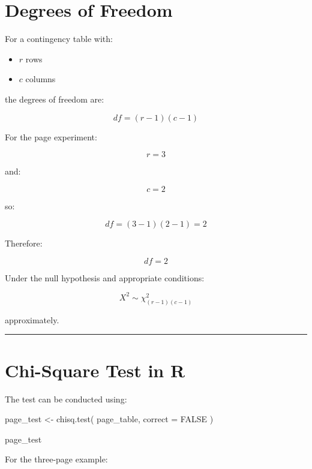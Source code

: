 \documentclass[
  letterpaper,
  DIV=11,
  numbers=noendperiod]{scrreprt}
\newenvironment{Shaded}{\begin{snugshade}}{\end{snugshade}}
\newcommand{\AttributeTok}[1]{\textcolor[rgb]{0.40,0.45,0.13}{#1}}
\newcommand{\ConstantTok}[1]{\textcolor[rgb]{0.56,0.35,0.01}{#1}}
\newcommand{\FunctionTok}[1]{\textcolor[rgb]{0.28,0.35,0.67}{#1}}
\newcommand{\NormalTok}[1]{\textcolor[rgb]{0.00,0.23,0.31}{#1}}
\newcommand{\OtherTok}[1]{\textcolor[rgb]{0.00,0.23,0.31}{#1}}
\providecommand{\tightlist}{%
  \setlength{\itemsep}{0pt}\setlength{\parskip}{0pt}}
\begin{document}

\chapter{Degrees of Freedom}\label{degrees-of-freedom}

For a contingency table with:

\begin{itemize}
\tightlist
\item
  \(r\) rows
\item
  \(c\) columns
\end{itemize}

the degrees of freedom are:

\[
\boxed{
df=(r-1)(c-1)
}
\]

For the page experiment:

\[
r=3
\]

and:

\[
c=2
\]

so:

\[
df
=
(3-1)(2-1)
=
2
\]

Therefore:

\[
\boxed{df=2}
\]

Under the null hypothesis and appropriate conditions:

\[
X^2
\sim
\chi^2_{(r-1)(c-1)}
\]

approximately.

\begin{center}\rule{0.5\linewidth}{0.5pt}\end{center}


\chapter{Chi-Square Test in R}\label{chi-square-test-in-r}

The test can be conducted using:

\begin{Shaded}
\begin{Highlighting}[]
\NormalTok{page\_test }\OtherTok{\textless{}{-}} \FunctionTok{chisq.test}\NormalTok{(}
\NormalTok{    page\_table,}
    \AttributeTok{correct =} \ConstantTok{FALSE}
\NormalTok{)}

\NormalTok{page\_test}
\end{Highlighting}
\end{Shaded}

For the three-page example:
\end{document}
